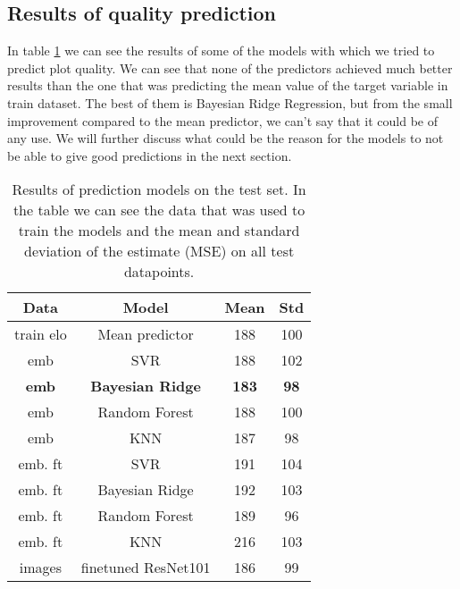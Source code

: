 \documentclass[fleqn,moreauthors,10pt]{ds_report}
\begin{document}
\subsection*{Results of quality prediction}
In table \ref{table_of_results} we can see the results of some of the models with which we tried to predict plot quality. We can see that none of the predictors achieved much better results than the one that was predicting the mean value of the target variable in train dataset. The best of them is Bayesian Ridge Regression, but from the small improvement compared to the mean predictor, we can't say that it could be of any use. We will further discuss what could be the reason for the models to not be able to give good predictions in the next section.

\begin{table} \centering
\begin{tabular}{|c|c|c|c|}
    \hline
     Data & Model & Mean & Std  \\
     \hline
     \hline
     train elo & Mean predictor & 188 & 100 \\
     \hline
     emb & SVR & 188 & 102 \\
     \textbf{emb} & \textbf{Bayesian Ridge} & \textbf{183} & \textbf{98} \\
     emb & Random Forest & 188 & 100 \\
     emb & KNN & 187 & 98 \\
     \hline
     emb. ft & SVR & 191 & 104 \\
     emb. ft & Bayesian Ridge & 192 & 103 \\
     emb. ft & Random Forest & 189 & 96 \\
     emb. ft & KNN & 216 & 103  \\
     \hline
     images & finetuned ResNet101 & 186 & 99 \\
    \hline
\end{tabular}
     \caption{Results of prediction models on the test set. In the table we can see the data that was used to train the models and the mean and standard deviation of the estimate (MSE) on all test datapoints.}
     \label{table_of_results}
\end{table}
\end{document}
